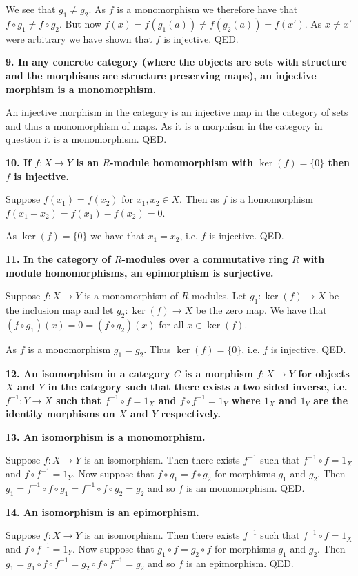 \documentclass[12pt]{article}
\begin{document}
We see that $g_1 \neq g_2$. As $f$ is a monomorphism we therefore have that $f\circ g_1 \neq f\circ g_2$. But now $f(x) = f(g_1(a)) \neq f(g_2(a)) = f(x')$. As $x \neq x'$ were arbitrary we have shown that $f$ is injective. QED.

\textbf{9. In any concrete category (where the objects are sets with structure and the morphisms are structure preserving maps), an injective morphism is a monomorphism.}

An injective morphism in the category is an injective map in the category of sets and thus a monomorphism of maps. As it is a morphism in the category in question it is a monomorphism. QED.

\textbf{10. If $f : X \to Y$ is an $R$-module homomorphism with $\ker(f) = \{0\}$ then $f$ is injective.}

Suppose $f(x_1) = f(x_2)$ for $x_1, x_2 \in X$. Then as $f$ is a homomorphism $f(x_1 - x_2) = f(x_1) - f(x_2) = 0$.

As $\ker(f) = \{0\}$ we have that $x_1 = x_2$, i.e. $f$ is injective. QED.

\textbf{11. In the category of $R$-modules over a commutative ring $R$ with module homomorphisms, an epimorphism is surjective.}

Suppose $f : X \to Y$ is a monomorphism of $R$-modules. Let $g_1 : \ker(f) \to X$ be the inclusion map and let $g_2 : \ker(f) \to X$ be the zero map. We have that $(f\circ g_1)(x) = 0 = (f\circ g_2)(x)$ for all $x \in \ker(f)$.

As $f$ is a monomorphism $g_1 = g_2$. Thus $\ker(f) = \{0\}$, i.e. $f$ is injective. QED.

\textbf{12. An isomorphism in a category $C$ is a morphism $f : X \to Y$ for objects $X$ and $Y$ in the category such that there exists a two sided inverse, i.e. $f^{-1} : Y \to X$ such that $f^{-1}\circ f = 1_X$ and $f\circ f^{-1} = 1_Y$ where $1_X$ and $1_Y$ are the identity morphisms on $X$ and $Y$ respectively.}

\textbf{13. An isomorphism is a monomorphism.}

Suppose $f : X \to Y$ is an isomorphism. Then there exists $f^{-1}$ such that $f^{-1}\circ f = 1_X$ and $f\circ f^{-1} = 1_Y$. Now suppose that $f\circ g_1 = f\circ g_2$ for morphisms $g_1$ and $g_2$. Then $g_1 = f^{-1}\circ f \circ g_1 = f^{-1}\circ f\circ g_2 = g_2$ and so $f$ is an monomorphism. QED.

\textbf{14. An isomorphism is an epimorphism.}

Suppose $f : X \to Y$ is an isomorphism. Then there exists $f^{-1}$ such that $f^{-1}\circ f = 1_X$ and $f\circ f^{-1} = 1_Y$. Now suppose that $g_1\circ f = g_2\circ f$ for morphisms $g_1$ and $g_2$. Then $g_1 = g_1\circ f\circ f^{-1}  = g_2\circ f\circ f^{-1} = g_2$ and so $f$ is an epimorphism. QED.
\end{document}
